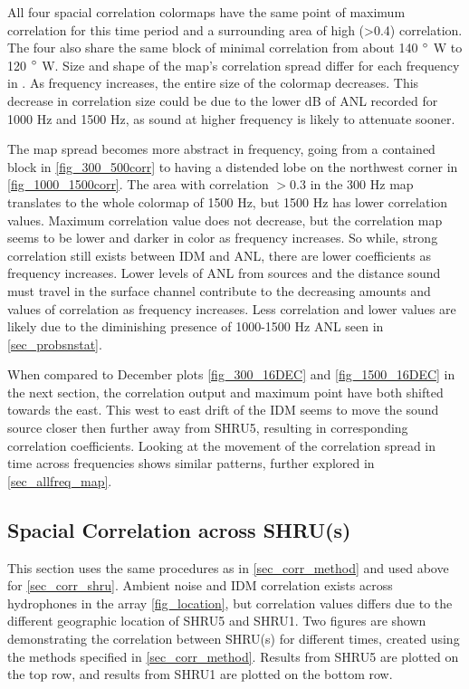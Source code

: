All four spacial correlation colormaps have the same point of maximum correlation for this time period and a surrounding area of high (>0.4) correlation. The four also share the same block of minimal correlation from about 140 $\degree$ W to 120 $\degree$ W. Size and shape of the map's correlation spread differ for each frequency in . As frequency increases, the entire size of the colormap decreases. This decrease in correlation size could be due to the lower dB of ANL recorded for 1000 Hz and 1500 Hz, as  sound at higher frequency is likely to attenuate sooner. 

The map spread becomes more abstract in frequency, going from a contained block in \autoref{fig_300_500corr} to having a distended lobe on the northwest corner in \autoref{fig_1000_1500corr}. The area with correlation $>0.3$ in the 300 Hz map translates to the whole colormap of 1500 Hz, but 1500 Hz has lower correlation values. Maximum correlation value does not decrease, but the correlation map seems to be lower and darker in color as frequency increases. So while, strong correlation still exists between IDM and ANL, there are lower coefficients as frequency increases. Lower levels of ANL from sources and the distance sound must travel in the surface channel contribute to the decreasing amounts and values of correlation as frequency increases. Less correlation and lower values are likely due to the diminishing presence of 1000-1500 Hz ANL seen in \autoref{sec_probsnstat}.

When compared to December plots \autoref{fig_300_16DEC} and \autoref{fig_1500_16DEC} in the next section, the correlation output and maximum point have both shifted towards the east. This west to east drift of the IDM seems to move the sound source closer then further away from SHRU5, resulting in corresponding correlation coefficients. Looking at the movement of the correlation spread in time across frequencies shows similar patterns, further explored in \autoref{sec_allfreq_map}.


\subsection{Spacial Correlation across SHRU(s)} \label{sec_corr_shru}

This section uses the same procedures as in \autoref{sec_corr_method} and used above for \autoref{sec_corr_shru}. Ambient noise and IDM correlation exists across hydrophones in the array \autoref{fig_location}, but correlation values differs due to the different geographic location of SHRU5 and SHRU1. Two figures are shown demonstrating the correlation between SHRU(s) for different times, created using the methods specified in \autoref{sec_corr_method}. Results from SHRU5 are plotted on the top row, and results from SHRU1 are plotted on the bottom row. 

